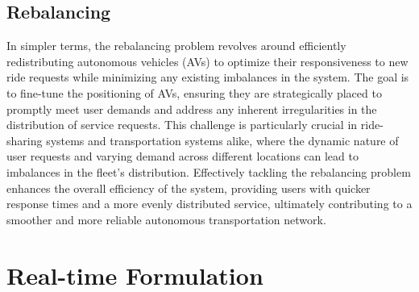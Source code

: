 \subsection{Rebalancing}
In simpler terms, the rebalancing problem revolves around efficiently redistributing autonomous vehicles (AVs) to optimize their responsiveness to new ride requests while minimizing any existing imbalances in the system. The goal is to fine-tune the positioning of AVs, ensuring they are strategically placed to promptly meet user demands and address any inherent irregularities in the distribution of service requests. This challenge is particularly crucial in ride-sharing  systems and transportation systems alike, where the dynamic nature of user requests and varying demand across different locations can lead to imbalances in the fleet's distribution. Effectively tackling the rebalancing problem enhances the overall efficiency of the system, providing users with quicker response times and a more evenly distributed service, ultimately contributing to a smoother and more reliable autonomous transportation network. 
\section{Real-time Formulation}

%
%
%


